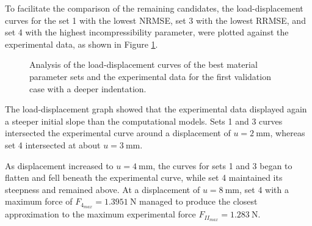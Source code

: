 To facilitate the comparison of the remaining candidates, the load-displacement curves for the 
set \SI{1}{} with the lowest NRMSE, set \SI{3}{} with the lowest RRMSE, and set \SI{4}{}  with the highest 
incompressibility parameter, were plotted against the experimental data, as shown in Figure \ref{fig:8mmloaddisplcurves}.\\ 
\begin{figure}%
    \centering
   \quad
   \caption[First validation case load-displacement curves]{Analysis of the load-displacement curves of the best material parameter sets and the experimental data for the first validation case with a deeper indentation.}%
   \label{fig:8mmloaddisplcurves}%
\end{figure}

The load-displacement graph showed that the experimental data displayed again a steeper initial slope 
than the computational models. Sets \SI{1}{} and \SI{3}{} curves intersected the experimental curve 
around a displacement of $u=\SI{2}{\milli \meter}$, whereas set \SI{4}{} intersected at about $u=\SI{3}{\milli \meter}$.

As displacement increased to $u=\SI{4}{\milli \meter}$, the curves for sets \SI{1}{} and \SI{3}{} began 
to flatten and fell beneath the experimental curve, while set \SI{4}{} maintained its steepness and remained above.
At a displacement of $u=\SI{8}{\milli \meter}$, set \SI{4}{} with a maximum force of 
$F_{4_{max}}=\SI{1.3951}{\newton}$ managed to produce the closest 
approximation to the maximum experimental force $F_{II_{max}}=\SI{1.283}{\newton}$.

